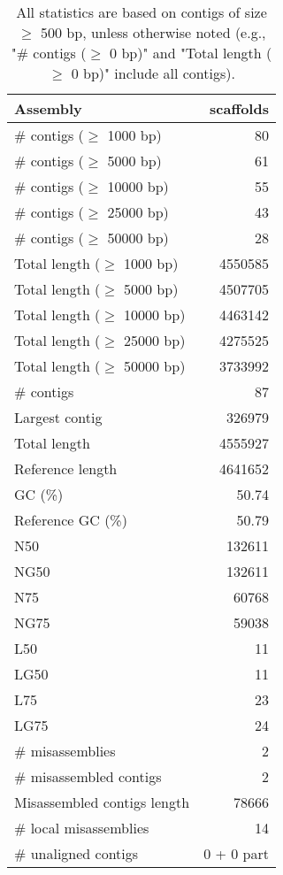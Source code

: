 \documentclass[12pt,a4paper]{article}
\begin{document}
\begin{table}[ht]
\begin{center}
\caption{All statistics are based on contigs of size $\geq$ 500 bp, unless otherwise noted (e.g., "\# contigs ($\geq$ 0 bp)" and "Total length ($\geq$ 0 bp)" include all contigs).}
\begin{tabular}{|l*{1}{|r}|}
\hline
Assembly & scaffolds \\ \hline
\# contigs ($\geq$ 1000 bp) & 80 \\ \hline
\# contigs ($\geq$ 5000 bp) & 61 \\ \hline
\# contigs ($\geq$ 10000 bp) & 55 \\ \hline
\# contigs ($\geq$ 25000 bp) & 43 \\ \hline
\# contigs ($\geq$ 50000 bp) & 28 \\ \hline
Total length ($\geq$ 1000 bp) & 4550585 \\ \hline
Total length ($\geq$ 5000 bp) & 4507705 \\ \hline
Total length ($\geq$ 10000 bp) & 4463142 \\ \hline
Total length ($\geq$ 25000 bp) & 4275525 \\ \hline
Total length ($\geq$ 50000 bp) & 3733992 \\ \hline
\# contigs & 87 \\ \hline
Largest contig & 326979 \\ \hline
Total length & 4555927 \\ \hline
Reference length & 4641652 \\ \hline
GC (\%) & 50.74 \\ \hline
Reference GC (\%) & 50.79 \\ \hline
N50 & 132611 \\ \hline
NG50 & 132611 \\ \hline
N75 & 60768 \\ \hline
NG75 & 59038 \\ \hline
L50 & 11 \\ \hline
LG50 & 11 \\ \hline
L75 & 23 \\ \hline
LG75 & 24 \\ \hline
\# misassemblies & 2 \\ \hline
\# misassembled contigs & 2 \\ \hline
Misassembled contigs length & 78666 \\ \hline
\# local misassemblies & 14 \\ \hline
\# unaligned contigs & 0 + 0 part \\ \hline

\end{tabular}
\end{center}
\end{table}
\end{document}
